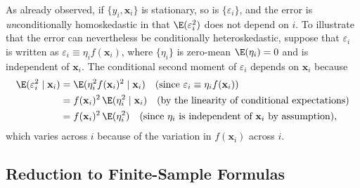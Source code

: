 \begin{example}
\label{ex:2.6}
As already observed, if $\{y_i, \mathbf{x}_i\}$ is stationary, so is
$\{\varepsilon_i\}$, and the error is \emph{un}conditionally homoskedastic in that
$\E(\varepsilon_i^2)$ does not depend on $i$.  To illustrate that the error can
nevertheless be conditionally heteroskedastic, suppose that $\varepsilon_i$ is written as
$\varepsilon_i \equiv \eta_i f(\mathbf{x}_i)$, where $\{\eta_i\}$ is zero-mean
$\E(\eta_i) = 0$ and is independent of $\mathbf{x}_i$.  The conditional second moment of
$\varepsilon_i$ depends on $\mathbf{x}_i$ because
\begin{align*}
  \E(\varepsilon_i^2 \mid \mathbf{x}_i)
    &= \E(\eta_i^2 f(\mathbf{x}_i)^2 \mid \mathbf{x}_i)
    \quad (\text{since } \varepsilon_i \equiv \eta_i f(\mathbf{x}_i)) \\
    &= f(\mathbf{x}_i)^2 \,\E(\eta_i^2 \mid \mathbf{x}_i)
    \quad (\text{by the linearity of conditional expectations}) \\
    &= f(\mathbf{x}_i)^2 \,\E(\eta_i^2)
    \quad (\text{since } \eta_i \text{ is independent of } \mathbf{x}_i
      \text{ by assumption}),
\end{align*}
which varies across $i$ because of the variation in $f(\mathbf{x}_i)$ across $i$.
\end{example}

\subsection*{Reduction to Finite-Sample Formulas}

